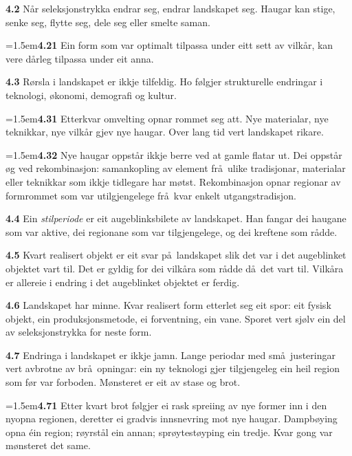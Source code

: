 \documentclass[11pt, a4paper]{article}
\newcommand{\prop}[1]{\bigskip\noindent{\Large\textbf{#1}}\medskip\par}
\newcommand{\subprop}[1]{\medskip\noindent\textbf{#1}\quad}
\newcommand{\subsubprop}[1]{\smallskip\hangindent=1.5em\noindent\hspace{1.5em}\textbf{#1}\quad}
\begin{document}
\subprop{4.2} N\aa r seleksjonstrykka endrar seg, endrar landskapet seg. Haugar kan stige, senke seg, flytte seg, dele seg eller smelte saman.

\subsubprop{4.21} Ein form som var optimalt tilpassa under eitt sett av vilk\aa r, kan vere d\aa rleg tilpassa under eit anna.

\subprop{4.3} R\o rsla i landskapet er ikkje tilfeldig. Ho f\o lgjer strukturelle endringar i teknologi, \o konomi, demografi og kultur.

\subsubprop{4.31} Etterkvar omvelting opnar rommet seg att. Nye materialar, nye teknikkar, nye vilk\aa r gjev nye haugar. Over lang tid vert landskapet rikare.

\subsubprop{4.32} Nye haugar oppst\aa r ikkje berre ved at gamle flatar ut. Dei oppst\aa r \o g ved rekombinasjon: samankopling av element fr\aa\ ulike tradisjonar, materialar eller teknikkar som ikkje tidlegare har m\o tst. Rekombinasjon opnar regionar av formrommet som var utilgjengelege fr\aa\ kvar enkelt utgangstradisjon.

\subprop{4.4} Ein \textit{stilperiode} er eit augeblinksbilete av landskapet. Han fangar dei haugane som var aktive, dei regionane som var tilgjengelege, og dei kreftene som r\aa dde.

\subprop{4.5} Kvart realisert objekt er eit svar p\aa\ landskapet slik det var i det augeblinket objektet vart til. Det er gyldig for dei vilk\aa ra som r\aa dde d\aa\ det vart til. Vilk\aa ra er allereie i endring i det augeblinket objektet er ferdig.

\subprop{4.6} Landskapet har minne. Kvar realisert form etterlet seg eit spor: eit fysisk objekt, ein produksjonsmetode, ei forventning, ein vane. Sporet vert sj\o lv ein del av seleksjonstrykka for neste form.

\subprop{4.7} Endringa i landskapet er ikkje jamn. Lange periodar med sm\aa\ justeringar vert avbrotne av br\aa\ opningar: ein ny teknologi gjer tilgjengeleg ein heil region som f\o r var forboden. M\o nsteret er eit av stase og brot.

\subsubprop{4.71} Etter kvart brot f\o lgjer ei rask spreiing av nye former inn i den nyopna regionen, deretter ei gradvis innsnevring mot nye haugar. Dampb\o ying opna \'ein region; r\o yrst\aa l ein annan; spr\o ytest\o yping ein tredje. Kvar gong var m\o nsteret det same.

\prop{5 Materialet deltek i \aa\ avgjere forma.}
\end{document}
